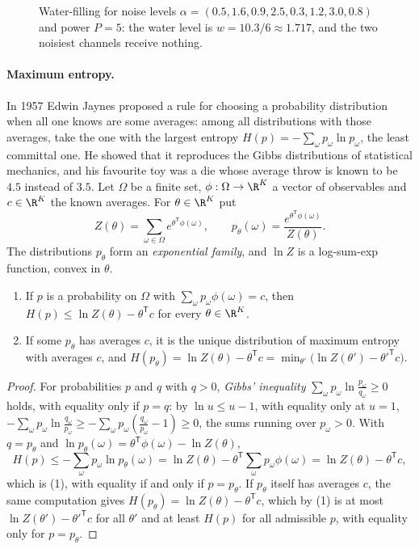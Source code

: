 \begin{figure}[ht]
\centering
{}
\caption{Water-filling for noise levels $\alpha=(0.5,1.6,0.9,2.5,0.3,1.2,3.0,0.8)$ and power $P=5$: the water level is $w=10.3/6\approx1.717$, and the two noisiest channels receive nothing.}
\label{fig:waterfilling}
\end{figure}

\paragraph{Maximum entropy.} In 1957 Edwin Jaynes proposed a rule for choosing a probability distribution when all one knows are some averages: among all
distributions with those averages, take the one with the largest entropy $H(p)=-\sum_\omega p_\omega\ln p_\omega$, the least committal one. He showed that it reproduces the Gibbs
distributions of statistical mechanics, and his favourite toy was a die whose average throw is known to be $4.5$ instead of $3.5$. Let $\Omega$ be a finite set,
$\phi:\Omega\to\R^K$ a vector of observables and $c\in\R^K$ the known averages. For $\theta\in\R^K$ put
\[
Z(\theta)=\sum_{\omega\in\Omega}e^{\theta^{\mathsf T}\phi(\omega)},\qquad p_\theta(\omega)=\frac{e^{\theta^{\mathsf T}\phi(\omega)}}{Z(\theta)}.
\]
The distributions $p_\theta$ form an \emph{exponential family}, and $\ln Z$ is a log-sum-exp function, convex in $\theta$.

\begin{theorem}\label{thm:maxent}
\begin{enumerate}
\item If $p$ is a probability on $\Omega$ with $\sum_\omega p_\omega\phi(\omega)=c$, then $H(p)\le\ln Z(\theta)-\theta^{\mathsf T}c$ for every $\theta\in\R^K$.
\item If some $p_\theta$ has averages $c$, it is the unique distribution of maximum entropy with averages $c$, and $H(p_\theta)=\ln Z(\theta)-\theta^{\mathsf T}c=\min_{\theta'}\bigl(\ln Z(\theta')-\theta'^{\mathsf T}c\bigr)$.
\end{enumerate}
\end{theorem}
\begin{proof}
For probabilities $p$ and $q$ with $q>0$, \emph{Gibbs' inequality} $\sum_\omega p_\omega\ln\frac{p_\omega}{q_\omega}\ge0$ holds, with equality only if $p=q$: by $\ln u\le u-1$, with equality only at
$u=1$, $-\sum_\omega p_\omega\ln\frac{q_\omega}{p_\omega}\ge-\sum_\omega p_\omega(\frac{q_\omega}{p_\omega}-1)\ge0$, the sums running over $p_\omega>0$. With $q=p_\theta$ and $\ln p_\theta(\omega)=\theta^{\mathsf T}\phi(\omega)-\ln Z(\theta)$,
\[
H(p)\le-\sum_\omega p_\omega\ln p_\theta(\omega)=\ln Z(\theta)-\theta^{\mathsf T}\sum_\omega p_\omega\phi(\omega)=\ln Z(\theta)-\theta^{\mathsf T}c,
\]
which is (1), with equality if and only if $p=p_\theta$. If $p_\theta$ itself has averages $c$, the same computation gives $H(p_\theta)=\ln Z(\theta)-\theta^{\mathsf T}c$, which by (1) is at most
$\ln Z(\theta')-\theta'^{\mathsf T}c$ for all $\theta'$ and at least $H(p)$ for all admissible $p$, with equality only for $p=p_\theta$.
\end{proof}

